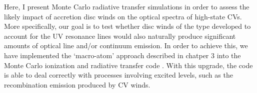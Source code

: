 

\nocite{groot2004}
\nocite{beuermann1990}
\nocite{beuermann1992}
\nocite{higginbottom2013}

Here, I present Monte Carlo radiative transfer simulations in
order to assess the likely impact of accretion disc winds on the
optical spectra of high-state CVs. More specifically, our goal is to
test whether disc winds of the type developed to account for the UV
resonance lines would also naturally produce significant amounts of  
optical line and/or continuum emission. In order to achieve this, we
have implemented the `macro-atom' approach described in chatper 3 
into the Monte Carlo ionization and radiative transfer code \py. 
With this upgrade, the code is able to deal correctly with processes involving
excited levels, such as the recombination emission produced by CV
winds.

